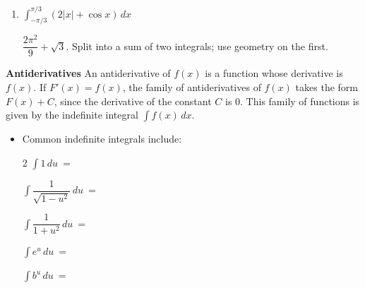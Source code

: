 \documentclass{article}
\begin{document}
\begin{enumerate}
\begin{enumerate}
  \begin{problem}
    $\displaystyle \int_{-2}^1 x \cdot 2^{x^2}\,dx$
  \end{problem}

  \begin{solution}
    $\displaystyle - \frac{7}{\ln 2}$.  Substitute $u = x^2$. 
  \end{solution}
  \probonly{\vfill}

\item

  \begin{problem}
    $\displaystyle \int_{-\pi/3}^{\pi/3} \left( 2|x| + \cos x \right)\,dx$
  \end{problem}

  \begin{solution}
    $\dfrac{2 \pi^2}{9} + \sqrt{3}$.  Split into a sum of two integrals;
    use geometry on the first.
  \end{solution}
  \probonly{\vfill}


\end{enumerate}

\probonly{\newpage}
  
  \begin{framed}
  \vspace{0.05in}
\textbf{Antiderivatives} An antiderivative of $f(x)$ is a function whose derivative is $f(x)$. If $F'(x)=f(x)$, the family of antiderivatives of $f(x)$ takes the form $F(x)+C$, since the derivative of the constant $C$ is $0$. This family of functions is given by the indefinite integral $\displaystyle \int f(x)\,dx$. 
    \vfill
    \begin{itemize}
    \item Common indefinite integrals include:

\begin{multicols}{2}
 $\displaystyle \int 1\,du\ =$
 \solonly{\textcolor{red}{$u+C$}}
 \newline
 
$\displaystyle \int \dfrac{1}{\sqrt{1-u^2}}\,du\ =$
\solonly{\textcolor{red}{$\arcsin u+C$}}
\newline
 
$\displaystyle \int \dfrac{1}{1+u^2}\,du\ =$
\solonly{\textcolor{red}{$\arctan u+C$}}
\newline

 $\displaystyle \int e^u\,du\ =$
 \solonly{\textcolor{red}{$e^u+C$}}
 \newline 
 
 $\displaystyle \int b^u\,du\ =$
\newline


\end{multicols}
\end{itemize}
\end{framed}
\end{enumerate}
\end{document}
